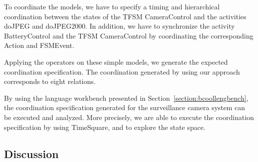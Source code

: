 To coordinate the models, we have to specify a timing and hierarchical coordination between the states of the TFSM CameraControl and the activities doJPEG and doJPEG2000. In addition, we have to synchronize the activity BatteryControl and the TFSM CameraControl by coordinating the corresponding Action and FSMEvent. 

Applying the operators on these simple models, we generate the expected coordination specification. The coordination generated by using our approach corresponds to eight \ccsl relations.
	
By using the language workbench presented in Section~\ref{section:bcoollengbench}, the coordination specification generated for the surveillance camera system can be executed and analyzed. More precisely, we are able to execute the coordination specification by using TimeSquare, and to explore the state space. 


\subsection{Discussion}
	
